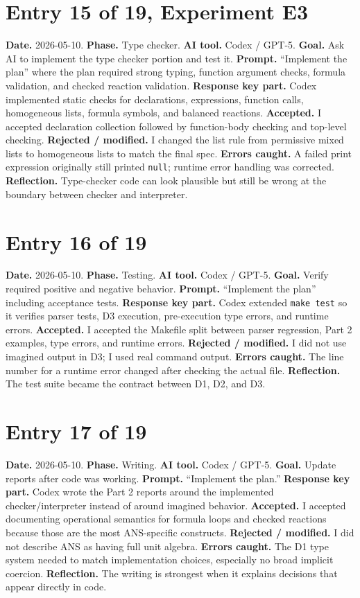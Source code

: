 \documentclass[11pt,a4paper]{article}
\newcommand{\code}[1]{\texttt{#1}}
\begin{document}
\section*{Entry 15 of 19, Experiment E3}
\textbf{Date.} 2026-05-10.
\textbf{Phase.} Type checker.
\textbf{AI tool.} Codex / GPT-5.
\textbf{Goal.} Ask AI to implement the type checker portion and test it.
\textbf{Prompt.} ``Implement the plan'' where the plan required strong typing, function argument checks, formula validation, and checked reaction validation.
\textbf{Response key part.} Codex implemented static checks for declarations, expressions, function calls, homogeneous lists, formula symbols, and balanced reactions.
\textbf{Accepted.} I accepted declaration collection followed by function-body checking and top-level checking.
\textbf{Rejected / modified.} I changed the list rule from permissive mixed lists to homogeneous lists to match the final spec.
\textbf{Errors caught.} A failed print expression originally still printed \code{null}; runtime error handling was corrected.
\textbf{Reflection.} Type-checker code can look plausible but still be wrong at the boundary between checker and interpreter.

\section*{Entry 16 of 19}
\textbf{Date.} 2026-05-10.
\textbf{Phase.} Testing.
\textbf{AI tool.} Codex / GPT-5.
\textbf{Goal.} Verify required positive and negative behavior.
\textbf{Prompt.} ``Implement the plan'' including acceptance tests.
\textbf{Response key part.} Codex extended \code{make test} so it verifies parser tests, D3 execution, pre-execution type errors, and runtime errors.
\textbf{Accepted.} I accepted the Makefile split between parser regression, Part 2 examples, type errors, and runtime errors.
\textbf{Rejected / modified.} I did not use imagined output in D3; I used real command output.
\textbf{Errors caught.} The line number for a runtime error changed after checking the actual file.
\textbf{Reflection.} The test suite became the contract between D1, D2, and D3.

\section*{Entry 17 of 19}
\textbf{Date.} 2026-05-10.
\textbf{Phase.} Writing.
\textbf{AI tool.} Codex / GPT-5.
\textbf{Goal.} Update reports after code was working.
\textbf{Prompt.} ``Implement the plan.''
\textbf{Response key part.} Codex wrote the Part 2 reports around the implemented checker/interpreter instead of around imagined behavior.
\textbf{Accepted.} I accepted documenting operational semantics for formula loops and checked reactions because those are the most ANS-specific constructs.
\textbf{Rejected / modified.} I did not describe ANS as having full unit algebra.
\textbf{Errors caught.} The D1 type system needed to match implementation choices, especially no broad implicit coercion.
\textbf{Reflection.} The writing is strongest when it explains decisions that appear directly in code.
\end{document}
